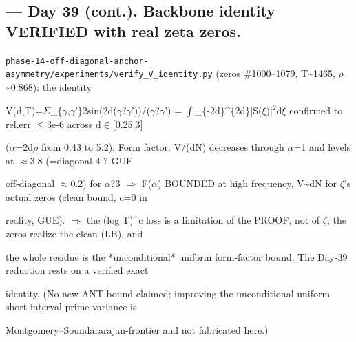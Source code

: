 \documentclass[10pt]{article}
\begin{document}
\subsection*{ --- Day 39 (cont.). Backbone identity VERIFIED with real zeta zeros.}
\texttt{phase-14-off-diagonal-anchor-asymmetry/experiments/verify\_V\_identity.py} (zeros \#1000--1079, T\textasciitilde{}1465, \ensuremath{\rho}\textasciitilde{}0.868): the identity\par
V(d,T)=\ensuremath{\Sigma}\_\{\ensuremath{\gamma},\ensuremath{\gamma}'\}2sin(2d(\ensuremath{\gamma}?\ensuremath{\gamma}'))/(\ensuremath{\gamma}?\ensuremath{\gamma}') = \ensuremath{\int}\_\{-2d\}\textasciicircum{}\{2d\}|S(\ensuremath{\xi})|\ensuremath{^2}d\ensuremath{\xi} confirmed to rel.err \ensuremath{\le}3e-6 across d\ensuremath{\in}[0.25,3]\par
(\ensuremath{\alpha}=2d\ensuremath{\rho} from 0.43 to 5.2). Form factor: V/(dN) decreases through \ensuremath{\alpha}=1 and levels at \ensuremath{\approx}3.8 (=diagonal 4 ? GUE\par
off-diagonal \ensuremath{\approx}0.2) for \ensuremath{\alpha}?3 \ensuremath{\Rightarrow} F(\ensuremath{\alpha}) BOUNDED at high frequency, V\textasciitilde{}dN for \ensuremath{\zeta}'s actual zeros (clean bound, c=0 in\par
reality, GUE). \ensuremath{\Rightarrow} the (log T)\textasciicircum{}c loss is a limitation of the PROOF, not of \ensuremath{\zeta}; the zeros realize the clean (LB), and\par
the whole residue is the *unconditional* uniform form-factor bound. The Day-39 reduction rests on a verified exact\par
identity. (No new ANT bound claimed; improving the unconditional uniform short-interval prime variance is\par
Montgomery--Soundararajan-frontier and not fabricated here.)\par
\end{document}
